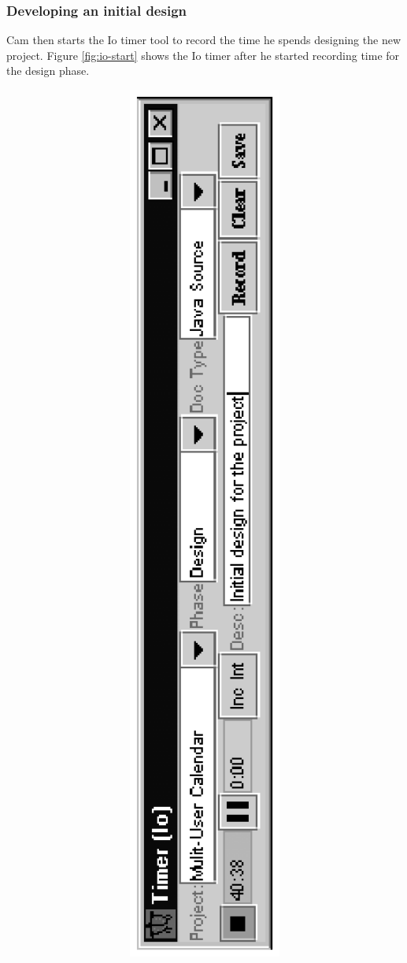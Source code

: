 \subsubsection*{Developing an initial design}
Cam then starts the Io timer tool to record the time he spends designing the
new project. Figure \ref{fig:io-start} shows the Io timer after he started
recording time for the design phase.
\begin{figure}[p]
  \centering
  \includegraphics[angle=270,width=5in]{io-start.ps}

\end{figure}
